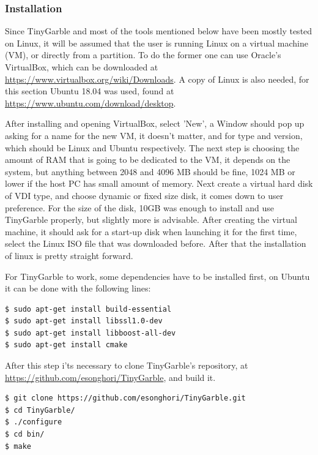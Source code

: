 \begin{refsection}
\subsubsection{Installation}

Since TinyGarble and most of the tools mentioned below have been mostly tested on Linux, it will be assumed that the user is running Linux on a virtual machine (VM), or directly from a partition. To do the former one can use Oracle's VirtualBox, which can be downloaded at \url{https://www.virtualbox.org/wiki/Downloads}. A copy of Linux is also needed, for this section Ubuntu 18.04 was used, found at \url{https://www.ubuntu.com/download/desktop}.

After installing and opening VirtualBox, select 'New', a Window should pop up asking for a name for the new VM, it doesn't matter, and for type and version, which should be Linux and Ubuntu respectively. The next step is choosing the amount of RAM that is going to be dedicated to the VM,  it depends on the system, but anything between 2048 and 4096 MB should be fine, 1024 MB or lower if the host PC has small amount of memory. Next create a virtual hard disk of VDI type, and choose dynamic or fixed size disk, it comes down to user preference. For the size of the disk, 10GB was enough to install and use TinyGarble properly, but slightly more is advisable.
After creating the virtual machine, it should ask for a start-up disk when launching it for the first time, select the Linux ISO file that was downloaded before. After that the installation of linux is pretty straight forward.

For TinyGarble to work, some dependencies have to be installed first, on Ubuntu it can be done with the following lines:

\begin{lstlisting}[caption={Installation of TinyGarble's dependencies}, language=bash, captionpos=b]
$ sudo apt-get install build-essential
$ sudo apt-get install libssl1.0-dev
$ sudo apt-get install libboost-all-dev
$ sudo apt-get install cmake
\end{lstlisting}

After this step i'ts necessary to clone TinyGarble's repository, at \url{https://github.com/esonghori/TinyGarble}, and build it.

\begin{lstlisting}[caption={Configuration and compilation of TinyGarble}, language=bash, captionpos=b]
$ git clone https://github.com/esonghori/TinyGarble.git
$ cd TinyGarble/
$ ./configure
$ cd bin/
$ make
\end{lstlisting}


\end{refsection}
